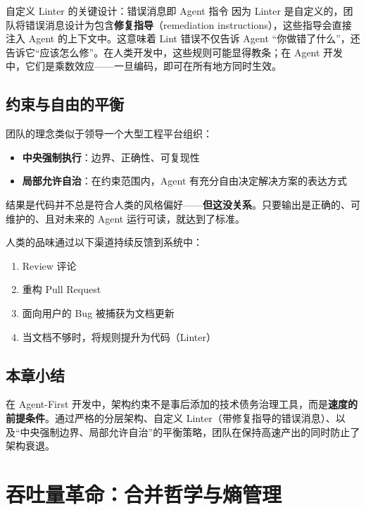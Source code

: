 \documentclass[a4paper]{article}
\begin{document}
\begin{warningbox}{自定义 Linter 的关键设计：错误消息即 Agent 指令}
因为 Linter 是自定义的，团队将错误消息设计为包含\textbf{修复指导}（remediation instructions），这些指导会直接注入 Agent 的上下文中。这意味着 Lint 错误不仅告诉 Agent ``你做错了什么''，还告诉它``应该怎么修''。在人类开发中，这些规则可能显得教条；在 Agent 开发中，它们是乘数效应——一旦编码，即可在所有地方同时生效。
\end{warningbox}

\subsection{约束与自由的平衡}

团队的理念类似于领导一个大型工程平台组织：

\begin{itemize}[nosep]
  \item \textbf{中央强制执行}：边界、正确性、可复现性
  \item \textbf{局部允许自治}：在约束范围内，Agent 有充分自由决定解决方案的表达方式
\end{itemize}

结果是代码并不总是符合人类的风格偏好——\textbf{但这没关系}。只要输出是正确的、可维护的、且对未来的 Agent 运行可读，就达到了标准。

人类的品味通过以下渠道持续反馈到系统中：

\begin{enumerate}[nosep]
  \item Review 评论
  \item 重构 Pull Request
  \item 面向用户的 Bug 被捕获为文档更新
  \item 当文档不够时，将规则提升为代码（Linter）
\end{enumerate}

\subsection{本章小结}

在 Agent-First 开发中，架构约束不是事后添加的技术债务治理工具，而是\textbf{速度的前提条件}。通过严格的分层架构、自定义 Linter（带修复指导的错误消息）、以及``中央强制边界、局部允许自治''的平衡策略，团队在保持高速产出的同时防止了架构衰退。

\newpage

\section{吞吐量革命：合并哲学与熵管理}
\end{document}

